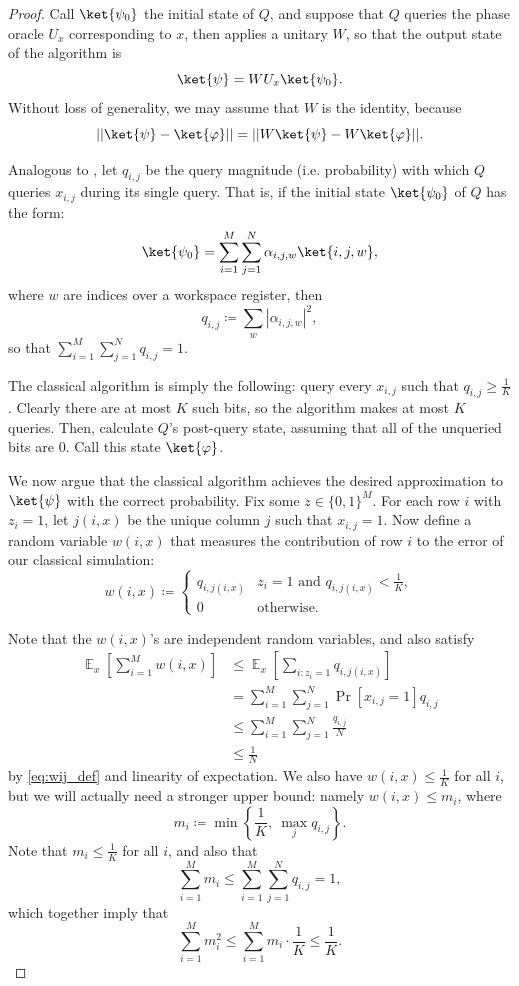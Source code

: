 \documentclass[10pt,a4paper]{article}
\newcommand{\E}{\mathop{\mathbb{E}}}
\begin{document}
\begin{proof}
Call $\ket{\psi_0}$ the initial state of $Q$, and suppose that $Q$ queries the phase oracle $U_x$ corresponding to $x$, then applies a unitary $W$, so that the output state of the algorithm is
\[
\ket{\psi} = W U_x \ket{\psi_0}.
\]
Without loss of generality, we may assume that $W$ is the identity, because
\[
|| \ket{\psi} - \ket{\varphi}|| = || W\ket{\psi} - W\ket{\varphi}||.
\]

Analogous to , let $q_{i,j}$ be the query magnitude (i.e. probability) with which $Q$ queries $x_{i,j}$ during its single query. That is, if the initial state $\ket{\psi_0}$ of $Q$ has the form:
\[
\ket{\psi_0} = \sum_{i=1}^M \sum_{j=1}^N \alpha_{i,j,w} \ket{i,j,w},
\]
where $w$ are indices over a workspace register, then
\[
q_{i,j} \coloneqq \sum_w |\alpha_{i,j,w}|^2,
\]
so that $\sum_{i=1}^M \sum_{j=1}^N q_{i,j} = 1$.

The classical algorithm is simply the following: query every $x_{i,j}$ such that $q_{i,j} \ge \frac{1}{K}$. Clearly there are at most $K$ such bits, so the algorithm makes at most $K$ queries. Then, calculate $Q$'s post-query state, assuming that all of the unqueried bits are $0$. Call this state $\ket{\varphi}$.

We now argue that the classical algorithm achieves the desired approximation to $\ket{\psi}$ with the correct probability. Fix some $z \in \{0,1\}^M$. For each row $i$ with $z_i = 1$, let $j(i, x)$ be the unique column $j$ such that $x_{i,j} = 1$. Now define a random variable $w(i,x)$ that measures the contribution of row $i$ to the error of our classical simulation:
\begin{equation}
\label{eq:wij_def}
w(i,x) \coloneqq \begin{cases}
q_{i,j(i,x)} & z_i = 1 \text{ and } q_{i,j(i,x)} < \frac{1}{K},\\
0 & \text{otherwise}.
\end{cases}
\end{equation}

Note that the $w(i,x)$'s are independent random variables, and also satisfy
\begin{align*}
\E_x \left[\sum_{i=1}^M w(i,x) \right] &\le \E_x \left[\sum_{i: z_i = 1} q_{i,j(i,x)} \right]\\
&= \sum_{i=1}^M \sum_{j=1}^N \Pr[x_{i,j} = 1] q_{i,j}\\
&\le \sum_{i=1}^M \sum_{j=1}^N \frac{q_{i,j}}{N} \\
&\le \frac{1}{N}
\end{align*}
by \eqref{eq:wij_def} and linearity of expectation. We also have $w(i, x) \le \frac{1}{K}$ for all $i$, but we will actually need a stronger upper bound: namely $w(i, x) \le m_i$, where
\[
m_i \coloneqq \min\left\{\frac{1}{K},\ \max_j q_{i,j}\right\}.
\]
Note that $m_i \le \frac{1}{K}$ for all $i$, and also that
\[
\sum_{i=1}^M m_i \le \sum_{i=1}^M \sum_{j=1}^N q_{i,j} = 1,
\]
which together imply that
\begin{equation}
\label{eq:sum_mi_squares}
\sum_{i=1}^M m_i^2 \le \sum_{i=1}^M m_i \cdot \frac{1}{K} \le \frac{1}{K}.
\end{equation}


\end{proof}
\end{document}
